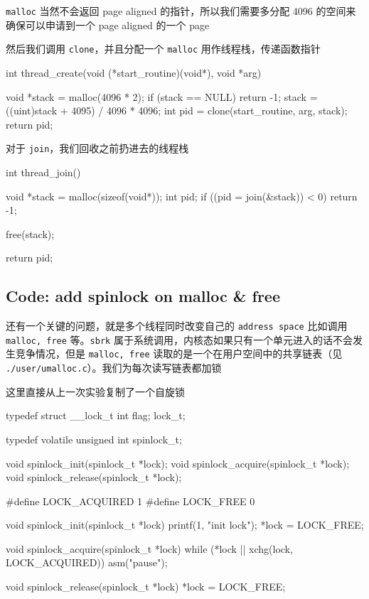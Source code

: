 \texttt{malloc} 当然不会返回 page aligned 的指针，所以我们需要多分配 4096 的空间来确保可以申请到一个 page aligned 的一个 page

然后我们调用 \texttt{clone}，并且分配一个 \texttt{malloc} 用作线程栈，传递函数指针

\begin{ccode}
    int
    thread_create(void (*start_routine)(void*), void *arg) 
    {
                  
        void *stack = malloc(4096 * 2);
        if (stack == NULL) return -1;
        stack = ((uint)stack + 4095) / 4096 * 4096;
        int pid = clone(start_routine, arg, stack);
        return pid;
    }
\end{ccode}

对于 \texttt{join}，我们回收之前扔进去的线程栈

\begin{ccode}
    int
    thread_join()
    {
        void *stack = malloc(sizeof(void*));
        int pid;
        if ((pid = join(&stack)) < 0) return -1;
        
        free(stack);
        
        return pid;
    }
\end{ccode}


\subsection{Code: add spinlock on malloc \& free}

还有一个关键的问题，就是多个线程同时改变自己的 \texttt{address space} 比如调用 \texttt{malloc, free} 等。\texttt{sbrk} 属于系统调用，内核态如果只有一个单元进入的话不会发生竞争情况，但是 \texttt{malloc, free} 读取的是一个在用户空间中的共享链表（见 \texttt{./user/umalloc.c}）。我们为每次读写链表都加锁

这里直接从上一次实验复制了一个自旋锁

\begin{ccode}
    typedef struct __lock_t { int flag; } lock_t;

    typedef volatile unsigned int spinlock_t;

    void spinlock_init(spinlock_t *lock);
    void spinlock_acquire(spinlock_t *lock);
    void spinlock_release(spinlock_t *lock);

    #define LOCK_ACQUIRED 1
    #define LOCK_FREE 0

    void spinlock_init(spinlock_t *lock)
    {
        printf(1, "init lock\n");
        *lock = LOCK_FREE;
    }

    void spinlock_acquire(spinlock_t *lock)
    {
        while (*lock || xchg(lock, LOCK_ACQUIRED))
        {
            asm("pause");
        }
    }

    void spinlock_release(spinlock_t *lock)
    {
        *lock = LOCK_FREE;
    }
\end{ccode}

